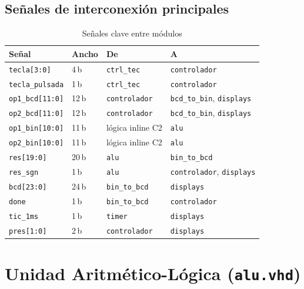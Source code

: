 \documentclass[memoria_final]{subfiles}
\begin{document}
\subsection{Señales de interconexión principales}

\begin{table}[H]
  \centering
  \caption{Señales clave entre módulos}
  \begin{tabular}{llll}
    \toprule
    \textbf{Señal} & \textbf{Ancho} & \textbf{De} & \textbf{A} \\
    \midrule
    \texttt{tecla[3:0]}       & 4\,b  & \texttt{ctrl\_tec}    & \texttt{controlador} \\
    \texttt{tecla\_pulsada}   & 1\,b  & \texttt{ctrl\_tec}    & \texttt{controlador} \\
    \texttt{op1\_bcd[11:0]}   & 12\,b & \texttt{controlador}  & \texttt{bcd\_to\_bin}, \texttt{displays} \\
    \texttt{op2\_bcd[11:0]}   & 12\,b & \texttt{controlador}  & \texttt{bcd\_to\_bin}, \texttt{displays} \\
    \texttt{op1\_bin[10:0]}   & 11\,b & lógica inline C2      & \texttt{alu} \\
    \texttt{op2\_bin[10:0]}   & 11\,b & lógica inline C2      & \texttt{alu} \\
    \texttt{res[19:0]}        & 20\,b & \texttt{alu}          & \texttt{bin\_to\_bcd} \\
    \texttt{res\_sgn}         & 1\,b  & \texttt{alu}          & \texttt{controlador}, \texttt{displays} \\
    \texttt{bcd[23:0]}        & 24\,b & \texttt{bin\_to\_bcd} & \texttt{displays} \\
    \texttt{done}             & 1\,b  & \texttt{bin\_to\_bcd} & \texttt{controlador} \\
    \texttt{tic\_1ms}         & 1\,b  & \texttt{timer}        & \texttt{displays} \\
    \texttt{pres[1:0]}        & 2\,b  & \texttt{controlador}  & \texttt{displays} \\
    \bottomrule
  \end{tabular}
\end{table}
\FloatBarrier

\section{Unidad Aritmético-Lógica (\texttt{alu.vhd})}
\end{document}
